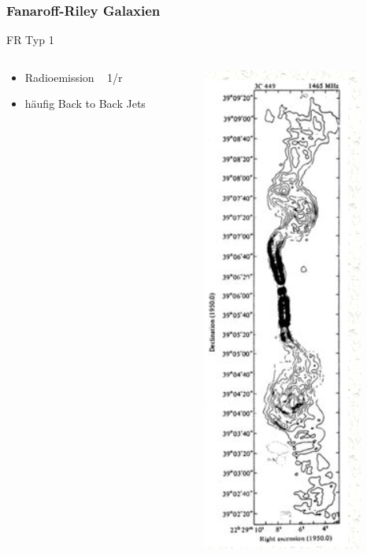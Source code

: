 \documentclass[aspectratio=1610, 9pt]{beamer}
\begin{document}
\begin{frame}\frametitle{Fanaroff-Riley Galaxien}
  \begin{block}{FR Typ 1}
  \begin{columns}
  \begin{column}{0.45\textwidth}
    \begin{itemize}
      \item Radioemission ~ 1/r
      \item h\"aufig Back to Back Jets
    \end{itemize}
  \end{column}
  \begin{column}{0.45\textwidth}
    \includegraphics{images/FR1.png}
  \end{column}
  \end{columns}
  \end{block}
\end{frame}
\end{document}
